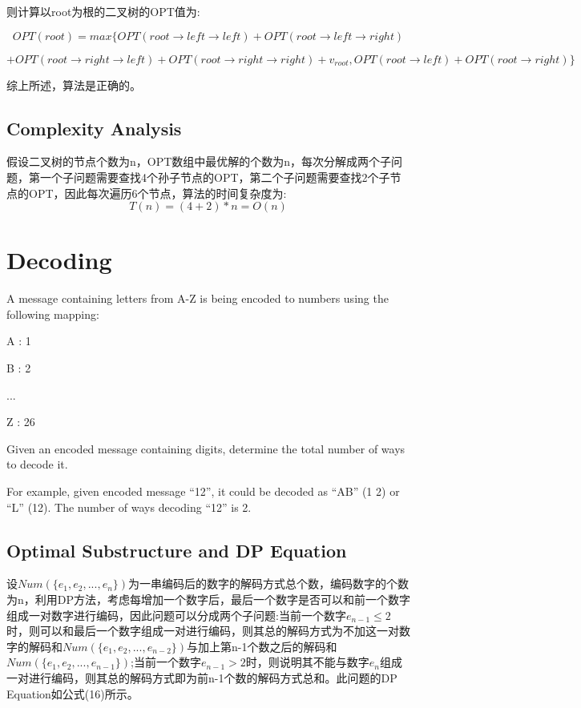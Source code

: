 \documentclass{article}
\begin{document}
\begin{CJK*}{UTF8}{gbsn}
则计算以root为根的二叉树的OPT值为:

\begin{equation}
OPT(root)=max\{OPT(root\rightarrow left\rightarrow left) +OPT(root\rightarrow left \rightarrow right)
\end{equation}

\begin{center}
$+OPT(root\rightarrow right\rightarrow left)+OPT(root\rightarrow right\rightarrow right)+v_{root}, OPT(root\rightarrow left)+OPT(root\rightarrow right)\}$
\end{center} 

综上所述，算法是正确的。

\subsection{Complexity Analysis}

假设二叉树的节点个数为n，OPT数组中最优解的个数为n，每次分解成两个子问题，第一个子问题需要查找4个孙子节点的OPT，第二个子问题需要查找2个子节点的OPT，因此每次遍历6个节点，算法的时间复杂度为:
\begin{equation}
T(n)=(4+2)*n=O(n)
\end{equation}

\newpage
\section{Decoding}

A message containing letters from A-Z is being encoded to numbers using the following mapping:

\begin{center}
A : 1

B : 2 

... 

Z : 26
\end{center}

Given an encoded message containing digits, determine the total number of ways to decode it.

For example, given encoded message “12”, it could be decoded as “AB” (1 2) or “L” (12). The number of ways decoding “12” is 2.

\subsection{Optimal Substructure and DP Equation}

设$Num(\{e_1,e_2,...,e_n\})$为一串编码后的数字的解码方式总个数，编码数字的个数为n，利用DP方法，考虑每增加一个数字后，最后一个数字是否可以和前一个数字组成一对数字进行编码，因此问题可以分成两个子问题:当前一个数字$e_{n-1}\leq2$时，则可以和最后一个数字组成一对进行编码，则其总的解码方式为不加这一对数字的解码和$Num(\{e_1,e_2,...,e_{n-2}\})$与加上第n-1个数之后的解码和$Num(\{e_1,e_2,...,e_{n-1}\})$;当前一个数字$e_{n-1}>2$时，则说明其不能与数字$e_n$组成一对进行编码，则其总的解码方式即为前n-1个数的解码方式总和。此问题的DP Equation如公式(16)所示。


\end{CJK*}
\end{document}
